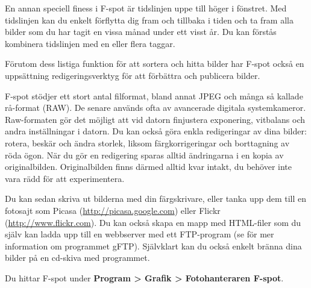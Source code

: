 \documentclass[a4paper,final]{memoir} %
\begin{document}
En annan speciell finess i F-spot är tidslinjen uppe till höger i fönstret. Med tidslinjen kan du enkelt förflytta dig fram och tillbaka i tiden och ta fram alla bilder som du har tagit en vissa månad under ett visst år. Du kan förstås kombinera tidslinjen med en eller flera taggar.

Förutom dess listiga funktion för att sortera och hitta bilder har F-spot också en uppsättning redigeringsverktyg för att förbättra och publicera bilder.


F-spot stödjer ett stort antal filformat, bland annat JPEG och många så kallade rå-format (RAW). De senare används ofta av avancerade digitala systemkameror. Raw-formaten gör det möjligt att vid datorn finjustera exponering, vitbalans och andra inställningar i datorn. Du kan också göra enkla redigeringar av dina bilder: rotera, beskär och ändra storlek, liksom färgkorrigeringar och borttagning av röda ögon. När du gör en redigering sparas alltid ändringarna i en kopia av originalbilden. Originalbilden finns därmed alltid kvar intakt, du behöver inte vara rädd för att experimentera. 

Du kan sedan skriva ut bilderna med din färgskrivare, eller tanka upp dem till en fotosajt som Picasa (\url{http://picasa.google.com}) eller Flickr (\url{http://www.flickr.com}). Du kan också skapa en mapp med HTML-filer som du själv kan ladda upp till en webbserver med ett FTP-program (se  för mer information om programmet gFTP). Självklart kan du också enkelt bränna dina bilder på en cd-skiva med programmet. 


Du hittar F-spot under \textbf{Program \textgreater{} Grafik \textgreater{} Fotohanteraren F-spot}. 
\end{document}
